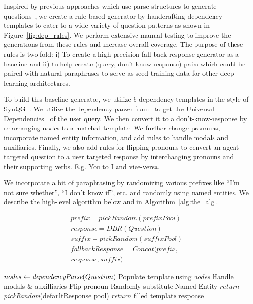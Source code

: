\documentclass[11pt,a4paper]{article}
\begin{document}
Inspired by previous approaches which use parse structures to generate questions~\cite{heilman2009question, mazidi-tarau-2016-infusing, dhole-manning-2020-syn}, we create a rule-based generator by handcrafting dependency templates to cater to a wide variety of question patterns as shown in Figure~\ref{fig:dep_rules}. We perform extensive manual testing to improve the generations from these rules and increase overall coverage. The purpose of these rules is two-fold: i) To create a high-precision fall-back response generator as a baseline and ii) to help create (query, don't-know-response) pairs which could be paired with natural paraphrases to serve as seed training data for other deep learning architectures.

To build this baseline generator, we utilize 9 dependency templates in the style of SynQG~\cite{dhole-manning-2020-syn}. We utilize the dependency parser from~\citet{andor2016globally} to get the Universal Dependencies~\cite{nivre2016universal, nivre2017universal} of the user query. We then convert it to a don't-know-response by re-arranging nodes to a matched template. We further change pronouns, incorporate named entity information, and add rules to handle modals and auxiliaries. Finally, we also add rules for flipping pronouns to convert an agent targeted question to a user targeted response by interchanging pronouns and their supporting verbs. E.g. You to I and vice-versa.

We incorporate a bit of paraphrasing by randomizing various prefixes like ``I'm not sure whether'', ``I don't know if'', etc. and randomly using named entities. We describe the high-level algorithm below and in Algorithm~\ref{alg:the_alg}.

\begin{gather*}
prefix = pickRandom(prefixPool) \\
response = DBR(Question)\\
suffix = pickRandom(suffixPool)\\
fallbackResponse = Concat(prefix,\\ response, suffix)
\end{gather*}

\begin{algorithm}[!hbpt]
\caption{Dependency Based Response (DBR)}
  \label{alg:the_alg}
\begin{algorithmic}
\State $nodes \gets \emph{dependencyParse}(Question)$
\State Populate template using \emph{nodes}
\State Handle modals \& auxilliaries
\State Flip pronoun
\State Randomly substitute Named Entity
\EndIf
\EndFor
{}
\State $return$ \emph{pickRandom}(defaultResponse pool)
\EndIf
\State $return$ filled template response

\end{algorithmic}
\end{algorithm}
\end{document}
